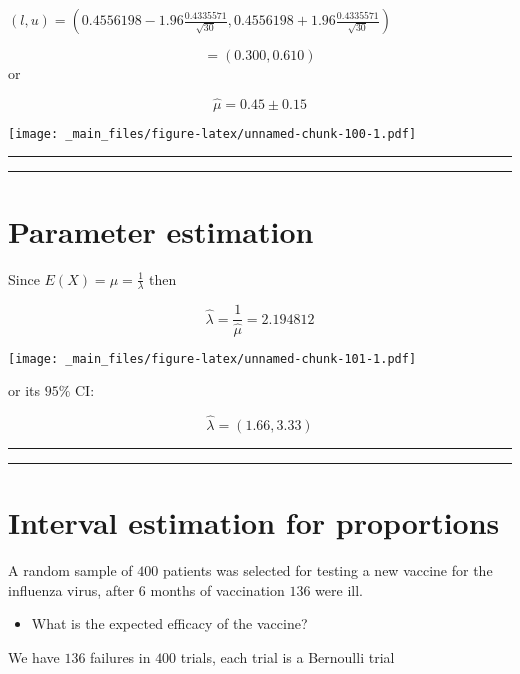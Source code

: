 \documentclass[
]{book}
\providecommand{\tightlist}{%
  \setlength{\itemsep}{0pt}\setlength{\parskip}{0pt}}
\begin{document}
\((l,u)=(0.4556198-1.96\frac{0.4335571}{\sqrt{30}}, 0.4556198+1.96\frac{0.4335571}{\sqrt{30}})\)

\[=(0.300,0.610)\]
or

\[\hat{\mu}=0.45 \pm 0.15\]

\texttt{[image: \_main\_files/figure-latex/unnamed-chunk-100-1.pdf]}

\begin{center}\rule{0.5\linewidth}{0.5pt}\end{center}

\begin{center}\rule{0.5\linewidth}{0.5pt}\end{center}

\hypertarget{parameter-estimation}{%
\section{Parameter estimation}\label{parameter-estimation}}

Since \(E(X)=\mu=\frac{1}{\lambda}\) then

\[\hat{\lambda}=\frac{1}{\hat{\mu}}=2.194812\]

\texttt{[image: \_main\_files/figure-latex/unnamed-chunk-101-1.pdf]}

or its \(95\%\) CI:

\[\hat{\lambda}= (1.66, 3.33) \]

\begin{center}\rule{0.5\linewidth}{0.5pt}\end{center}

\begin{center}\rule{0.5\linewidth}{0.5pt}\end{center}

\hypertarget{interval-estimation-for-proportions}{%
\section{Interval estimation for proportions}\label{interval-estimation-for-proportions}}

A random sample of \(400\) patients was selected for testing a new vaccine for the influenza virus, after \(6\) months of vaccination \(136\) were ill.~

\begin{itemize}
\tightlist
\item
  What is the expected efficacy of the vaccine?
\end{itemize}

We have \(136\) failures in \(400\) trials, each trial is a
Bernoulli trial
\end{document}
